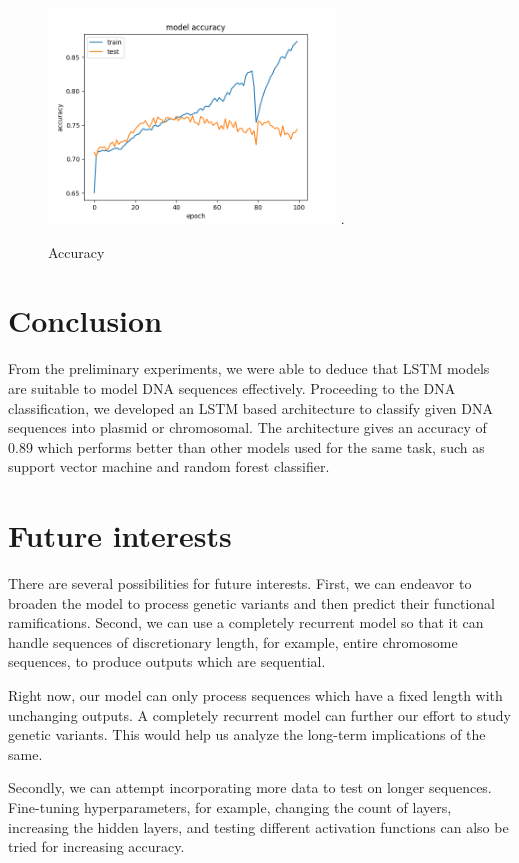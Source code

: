 \documentclass[conference]{IEEEtran}
\begin{document}
\begin{figure}[h]
\centering
\includegraphics[width=3in]{accuracy.png}
\DeclareGraphicsExtensions.
\caption{Accuracy}
\label{fig_sim}
\end{figure}

\section{Conclusion}
From the preliminary experiments, we were able to deduce that LSTM models are suitable to model DNA sequences effectively. Proceeding to the DNA classification, we developed an LSTM based architecture to classify given DNA sequences into plasmid or chromosomal. The architecture gives an accuracy of 0.89 which performs better than other models used for the same task, such as support vector machine and random forest classifier.

\section{Future interests}
There are several possibilities for future interests. First, we can endeavor to broaden the model to process genetic variants and then predict their functional ramifications. Second, we can use a completely recurrent model so that it can handle sequences of discretionary length, for example, entire chromosome sequences, to produce outputs which are sequential.\newline

Right now, our model can only process sequences which have a fixed length with unchanging outputs. A completely recurrent model can further our effort to study genetic variants. This would help us analyze the long-term implications of the same.\newline

Secondly, we can attempt incorporating more data to test on longer sequences. Fine-tuning hyperparameters, for example, changing the count of layers, increasing the hidden layers, and testing different activation functions can also be tried for increasing accuracy.\newline
\end{document}

